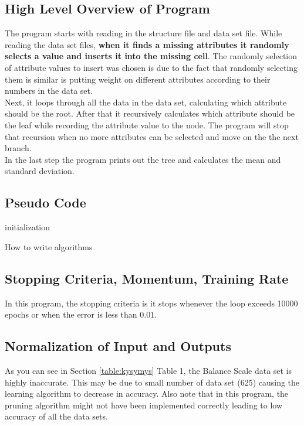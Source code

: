 \documentclass{sig-alternate-05-2015}
\begin{document}
\subsection{High Level Overview of Program}
The program starts with reading in the structure file and data set file. While reading the data set files, \textbf{when it finds a missing attributes it randomly selects a value and inserts it into the missing cell}. The randomly selection of attribute values to insert was chosen is due to the fact that randomly selecting them is similar is putting weight on different attributes according to their numbers in the data set. \\
\indent Next, it loops through all the data in the data set, calculating which attribute should be the root. After that it recursively calculates which attribute should be the leaf while recording the attribute value to the node. The program will stop that recursion when no more attributes can be selected and move on the the next branch.\\
\indent In the last step the program prints out the tree and calculates the mean and standard deviation.

\subsection{Pseudo Code}
\begin{algorithm}
 initialization\;
 \caption{How to write algorithms}
\end{algorithm}


\subsection{Stopping Criteria, Momentum, Training Rate}
In this program, the stopping criteria is it stops whenever the loop exceeds 10000 epochs or when the error is less than $0.01$. 

\subsection{Normalization of Input and Outputs}
As you can see in Section \ref{table:kysymys} Table 1, the Balance Scale data set is highly inaccurate. This may be due to small number of data set (625) causing the learning algorithm to decrease in accuracy. Also note that in this program, the pruning algorithm might not have been implemented correctly leading to low accuracy of all the data sets.
\end{document}
